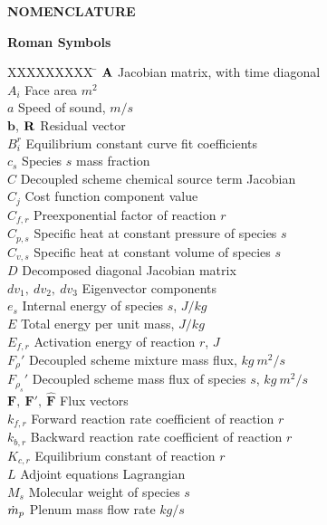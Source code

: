 \begin{center}
  \textbf{NOMENCLATURE}
\end{center}

\textbf{Roman Symbols}
\bigskip
\begin{tabbing}
  XXXXXXXXX \= \kill%
  $\mathbf A$ \> Jacobian matrix, with time diagonal \\
  $A_i$ \> Face area $m^2$ \\
  $a$ \> Speed of sound, $m/s$ \\
  $\mathbf{b}$, $\mathbf R_{}$ \> Residual vector \\
  $B^{r}_{i}$ \> Equilibrium constant curve fit coefficients \\
  $c_s$ \> Species $s$ mass fraction \\
  $C$ \> Decoupled scheme chemical source term Jacobian \\
  $C_j$ \> Cost function component value \\
  $C_{f,r}$ \> Preexponential factor of reaction $r$ \\
  $C_{p,s}$ \> Specific heat at constant pressure of species $s$ \\
  $C_{v,s}$ \> Specific heat at constant volume of species $s$ \\
  $D$ \> Decomposed diagonal Jacobian matrix \\
  $dv_1,\ dv_2,\ dv_3$ \> Eigenvector components \\
  $e_s$ \> Internal energy of species $s$, $J/kg$ \\
  $E$ \> Total energy per unit mass, $J/kg$ \\
  $E_{f,r}$\> Activation energy of reaction $r$, $J$ \\
  $F_\rho'$\> Decoupled scheme mixture mass flux, $kg\ m^2/s$ \\
  $F_{\rho_s}'$\> Decoupled scheme mass flux of species $s$, $kg\ m^2/s$ \\
  $\mathbf{F},\ \mathbf{F}',\ \mathbf{\hat{F}}$ \> Flux vectors \\
  $k_{f,r}$ \> Forward reaction rate coefficient of reaction $r$ \\
  $k_{b,r}$ \> Backward reaction rate coefficient of reaction $r$ \\
  $K_{c,r}$ \> Equilibrium constant of reaction $r$ \\
  $L$ \> Adjoint equations Lagrangian \\
  $M_s$ \> Molecular weight of species $s$ \\
  $\dot{m}_p$ \> Plenum mass flow rate $kg/s$ \\

\end{tabbing}
